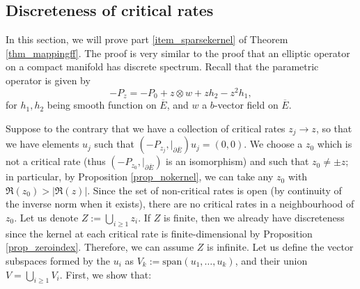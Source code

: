 \documentclass[10pt, a4paper]{article}
\theoremstyle{plain}%
\theoremstyle{definition}
\numberwithin{figure}{section}
\numberwithin{equation}{section}
\newcommand{\pa}{\partial}
\newcommand{\rt}{\rightarrow}
\newcommand{\oE}{{\overline{E}}}
\begin{document}
\subsection{Discreteness of critical rates}
In this section, we will prove part \ref{item_sparsekernel} of Theorem \ref{thm_mappingff}. The proof is very similar to the proof that an elliptic operator on a compact manifold has discrete spectrum. Recall that the parametric operator is given by \[
-P_z =  -P_0 + z\otimes w  +zh_2 -z^2h_1,
\]
for $h_1,h_2$ being smooth function on $\oE$, and $w$ a $b$-vector field on $\oE$.


Suppose to the contrary that we have a collection of critical rates $z_j \rt z$, so that we have elements $u_j$ such that $(-P_{z_j},|_{\pa\oE})u_j=(0,0)$. We choose a $z_0$ which is not a critical rate (thus $(-P_{z_0},|_{\pa\oE})$ is an isomorphism) and such that $z_0\neq \pm z$; in particular, by Proposition \ref{prop_nokernel}, we can take any $z_0$ with $\Re(z_0)> |\Re(z)|$. Since the set of non-critical rates is open (by continuity of the inverse norm when it exists), there are no critical rates in a neighbourhood of $z_0$. Let us denote $Z:=\bigcup_{i\geq 1} z_i$. If $Z$ is finite, then we already have discreteness since the kernel at each critical rate is finite-dimensional by Proposition \ref{prop_zeroindex}. Therefore, we can assume $Z$ is infinite. Let us define the vector subspaces formed by the $u_i$ as $V_k:= \textrm{span} (u_1,\dots,u_k)$, and their union $V=\bigcup_{i\geq 1}V_i$. First, we show that:
\end{document}
